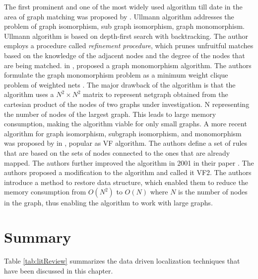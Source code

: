 The first prominent and one of the most widely used algorithm till date in the area of graph matching was proposed by \citeauthor{Ullmann:1976:ASI:321921.321925} \cite{Ullmann:1976:ASI:321921.321925}.
Ullmann algorithm addresses the problem of graph isomorphism, sub graph isomorphism, graph monomorphism. Ullmann algorithm is based on  depth-first search with backtracking.
The author employs a procedure called \textit{refinement procedure}, which prunes unfruitful matches based on the knowledge of the adjacent nodes and the degree of the nodes that are being matched.
\citeauthor{4308468} in \cite{4308468}, proposed a graph monomorphism algorithm.
The authors formulate the graph monomorphism problem as a minimum weight clique problem of weighted nets .
The major drawback of the algorithm is that the algorithm uses a $N^2 \times N^2$ matrix to represent netgraph obtained from the cartesian product of the nodes of two graphs under investigation.
N representing the number of nodes of the largest graph. This leads to large memory consumption, making the algorithm viable for only small graphs.
A more recent algorithm for graph isomorphism, subgraph isomorphism, and monomorphism was proposed by \citeauthor{906251} in \cite{906251}, popular as VF algorithm. 
The authors define a set of rules that are based on the sets of nodes connected to the ones that are already mapped.
The authors further improved the algorithm in 2001 in their paper \cite{cordella2001improved}. 
The authors proposed a modification to the algorithm and called it VF2.
The authors introduce a method to restore data structure, which enabled them to reduce the memory consumption from $O(N^2)$ to $O(N)$ where $N$ is the number of nodes in the graph, thus enabling the algorithm to work with large graphs.

\section{Summary}
Table \ref{tab:litReview} summarizes the data driven localization techniques that have been discussed in this chapter.


